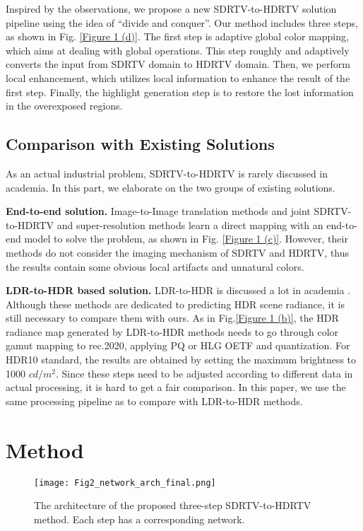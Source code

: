 \documentclass[10pt,twocolumn,letterpaper]{article}
\begin{document}
Inspired by the observations, we propose a new SDRTV-to-HDRTV solution pipeline using the idea of ``divide and conquer''. Our method includes three steps, as shown in Fig. \ref{Figure 1 (d)}. The first step is adaptive global color mapping, which aims at dealing with global operations. This step roughly and adaptively converts the input from SDRTV domain to HDRTV domain. Then, we perform local enhancement, which utilizes local information to enhance the result of the first step. Finally, the highlight generation step is to restore the lost information in the overexposed regions. 
\subsection{Comparison with Existing Solutions}
\label{Comparison with existing solutions}
As an actual industrial problem, SDRTV-to-HDRTV is rarely discussed in academia. In this part, we elaborate on the two groups of existing solutions.

\textbf{End-to-end solution.} Image-to-Image translation methods \cite{isola2017image, zhu2017unpaired} and joint SDRTV-to-HDRTV and super-resolution methods \cite{kim2019deep, kim2020jsi} learn a direct mapping with an end-to-end model to solve the problem, as shown in Fig. \ref{Figure 1 (c)}. However, their methods do not consider the imaging mechanism of SDRTV and HDRTV, thus the results contain some obvious local artifacts and unnatural colors.

\textbf{LDR-to-HDR based solution.} LDR-to-HDR is discussed a lot in academia \cite{rempel2007ldr2hdr, banterle2006inverse, masia2017}. Although these methods are dedicated to predicting HDR scene radiance, it is still necessary to compare them with ours. As in Fig.\ref{Figure 1 (b)}, the HDR radiance map generated by LDR-to-HDR methods needs to go through color gamut mapping to rec.2020, applying PQ or HLG OETF and quantization. For HDR10 standard, the results are obtained by setting the maximum brightness to 1000 $cd/m^2$. Since these steps need to be adjusted according to different data in actual processing, it is hard to get a fair comparison. In this paper, we use the same processing pipeline as \cite{kim2019deep, kim2020jsi} to compare with LDR-to-HDR methods.
\vspace{-4pt}
\section{Method}
\begin{figure*}[!t]
   \begin{center}
\texttt{[image: Fig2\_network\_arch\_final.png]}
   \end{center}
   \vspace{-8pt}
      \caption{The architecture of the proposed three-step SDRTV-to-HDRTV method. Each step has a corresponding network.}
     \vspace{-7pt}
   \label{Figure 2 architecture of three-step SDR-to-HDR}
   \end{figure*}
\end{document}
